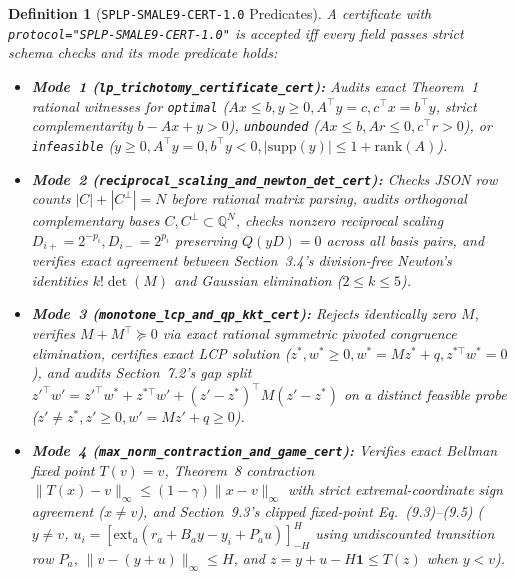 \documentclass[10pt,twocolumn]{article}
\newtheorem{definition}{Definition}
\newcommand{\QQ}{\mathbb{Q}}
\begin{document}
{\begin{definition}[\texttt{SPLP-SMALE9-CERT-1.0} Predicates]\label{def:cert}
\normalfont A certificate with \texttt{protocol="SPLP-\allowbreak SMALE9-\allowbreak CERT-1.0"} is accepted iff every field passes strict schema checks and its mode predicate holds:
\begin{itemize}[leftmargin=1.2em,itemsep=1pt,topsep=2pt]
  \item \textbf{Mode~1 (\texttt{lp\_\allowbreak trichotomy\_\allowbreak certificate\_\allowbreak cert}):} Audits exact Theorem~1 rational witnesses for \texttt{optimal} ($Ax\le b, y\ge 0, A^\top y=c, c^\top x=b^\top y$, strict complementarity $b-Ax+y>0$), \texttt{unbounded} ($Ax\le b, Ar\le 0, c^\top r>0$), or \texttt{infeasible} ($y\ge 0, A^\top y=0, b^\top y<0, |\mathrm{supp}(y)|\le 1+\mathrm{rank}(A)$).
  \item \textbf{Mode~2 (\texttt{reciprocal\_\allowbreak scaling\_\allowbreak and\_\allowbreak newton\_\allowbreak det\_\allowbreak cert}):} Checks JSON row counts $|C|+|C^\perp|=N$ before rational matrix parsing, audits orthogonal complementary bases $C, C^\perp\subset\QQ^N$, checks nonzero reciprocal scaling $D_{i+}=2^{-p_i}, D_{i-}=2^{p_i}$ preserving $Q(yD)=0$ across all basis pairs, and verifies exact agreement between Section~3.4's division-free Newton's identities $k!\det(M)$ and Gaussian elimination ($2\le k\le 5$).
  \item \textbf{Mode~3 (\texttt{monotone\_\allowbreak lcp\_\allowbreak and\_\allowbreak qp\_\allowbreak kkt\_\allowbreak cert}):} Rejects identically zero $M$, verifies $M+M^\top\succeq 0$ via exact rational symmetric pivoted congruence elimination, certifies exact LCP solution ($z^*,w^*\ge 0, w^*=Mz^*+q, z^{*\top}w^*=0$), and audits Section~7.2's gap split $z'^\top w'=z'^\top w^*+z^{*\top}w'+(z'-z^*)^\top M(z'-z^*)$ on a distinct feasible probe ($z'\ne z^*, z'\ge 0, w'=Mz'+q\ge 0$).
  \item \textbf{Mode~4 (\texttt{max\_\allowbreak norm\_\allowbreak contraction\_\allowbreak and\_\allowbreak game\_\allowbreak cert}):} Verifies exact Bellman fixed point $T(v)=v$, Theorem~8 contraction $\|T(x)-v\|_\infty\le (1-\gamma)\|x-v\|_\infty$ with strict extremal-coordinate sign agreement ($x\ne v$), and Section~9.3's clipped fixed-point Eq.~(9.3)--(9.5) ($y\ne v$, $u_i=[\mathrm{ext}_a(r_a+B_ay-y_i+P_au)]_{-H}^H$ using \emph{undiscounted} transition row $P_a$, $\|v-(y+u)\|_\infty\le H$, and $z=y+u-H\mathbf{1}\le T(z)$ when $y<v$).
\end{itemize}
\end{definition}}
\end{document}
